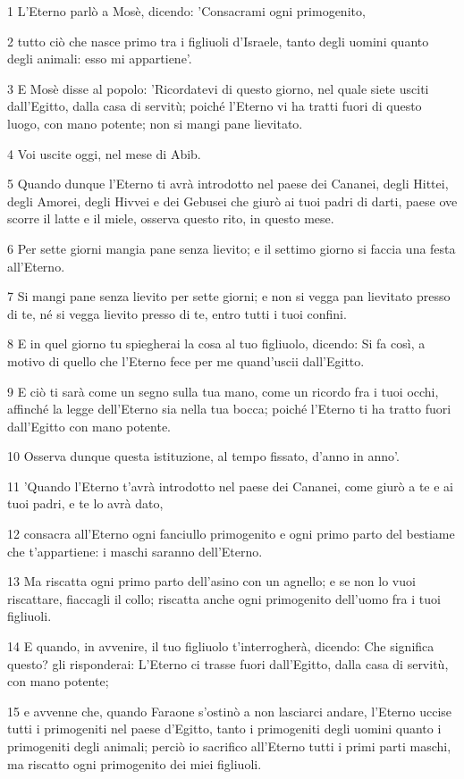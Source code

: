 \par 1 L'Eterno parlò a Mosè, dicendo: 'Consacrami ogni primogenito,
\par 2 tutto ciò che nasce primo tra i figliuoli d'Israele, tanto degli uomini quanto degli animali: esso mi appartiene'.
\par 3 E Mosè disse al popolo: 'Ricordatevi di questo giorno, nel quale siete usciti dall'Egitto, dalla casa di servitù; poiché l'Eterno vi ha tratti fuori di questo luogo, con mano potente; non si mangi pane lievitato.
\par 4 Voi uscite oggi, nel mese di Abib.
\par 5 Quando dunque l'Eterno ti avrà introdotto nel paese dei Cananei, degli Hittei, degli Amorei, degli Hivvei e dei Gebusei che giurò ai tuoi padri di darti, paese ove scorre il latte e il miele, osserva questo rito, in questo mese.
\par 6 Per sette giorni mangia pane senza lievito; e il settimo giorno si faccia una festa all'Eterno.
\par 7 Si mangi pane senza lievito per sette giorni; e non si vegga pan lievitato presso di te, né si vegga lievito presso di te, entro tutti i tuoi confini.
\par 8 E in quel giorno tu spiegherai la cosa al tuo figliuolo, dicendo: Si fa così, a motivo di quello che l'Eterno fece per me quand'uscii dall'Egitto.
\par 9 E ciò ti sarà come un segno sulla tua mano, come un ricordo fra i tuoi occhi, affinché la legge dell'Eterno sia nella tua bocca; poiché l'Eterno ti ha tratto fuori dall'Egitto con mano potente.
\par 10 Osserva dunque questa istituzione, al tempo fissato, d'anno in anno'.
\par 11 'Quando l'Eterno t'avrà introdotto nel paese dei Cananei, come giurò a te e ai tuoi padri, e te lo avrà dato,
\par 12 consacra all'Eterno ogni fanciullo primogenito e ogni primo parto del bestiame che t'appartiene: i maschi saranno dell'Eterno.
\par 13 Ma riscatta ogni primo parto dell'asino con un agnello; e se non lo vuoi riscattare, fiaccagli il collo; riscatta anche ogni primogenito dell'uomo fra i tuoi figliuoli.
\par 14 E quando, in avvenire, il tuo figliuolo t'interrogherà, dicendo: Che significa questo? gli risponderai: L'Eterno ci trasse fuori dall'Egitto, dalla casa di servitù, con mano potente;
\par 15 e avvenne che, quando Faraone s'ostinò a non lasciarci andare, l'Eterno uccise tutti i primogeniti nel paese d'Egitto, tanto i primogeniti degli uomini quanto i primogeniti degli animali; perciò io sacrifico all'Eterno tutti i primi parti maschi, ma riscatto ogni primogenito dei miei figliuoli.
